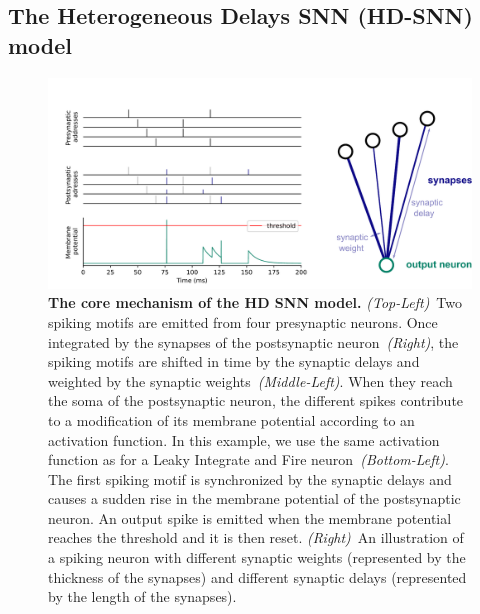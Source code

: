 \documentclass[default]{sn-jnl}%
\theoremstyle{thmstyleone}%
\theoremstyle{thmstyletwo}%
\theoremstyle{thmstylethree}%
\begin{document}
\subsection{The Heterogeneous Delays SNN (HD-SNN) model}
%
\begin{figure}%
    \centering
    \includegraphics[width=0.980\linewidth]{figures/HDSNN_graph.pdf}
    \caption{\textbf{The core mechanism of the HD SNN model.} \textit{(Top-Left)}~Two spiking motifs are emitted from four presynaptic neurons. Once integrated by the synapses of the postsynaptic neuron~\textit{(Right)}, the spiking motifs are shifted in time by the synaptic delays and weighted by the synaptic weights~\textit{(Middle-Left)}. When they reach the soma of the postsynaptic neuron, the different spikes contribute to a modification of its membrane potential according to an activation function. In this example, we use the same activation function as for a Leaky Integrate and Fire neuron~\textit{(Bottom-Left)}. The first spiking motif is synchronized by the synaptic delays and causes a sudden rise in the membrane potential of the postsynaptic neuron. An output spike is emitted when the membrane potential reaches the threshold and it is then reset.   \textit{(Right)}~An illustration of a spiking neuron with different synaptic weights (represented by the thickness of the synapses) and different synaptic delays (represented by the length of the synapses). }%
    \label{fig:izhikevich}%
\end{figure}%
% 
\end{document}
